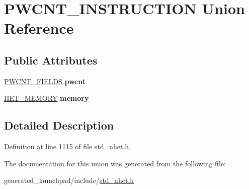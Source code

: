 \hypertarget{unionPWCNT__INSTRUCTION}{}\section{P\+W\+C\+N\+T\+\_\+\+I\+N\+S\+T\+R\+U\+C\+T\+I\+ON Union Reference}
\label{unionPWCNT__INSTRUCTION}
\subsection*{Public Attributes}
\begin{DoxyCompactItemize}
\item 
\mbox{\label{unionPWCNT__INSTRUCTION_a38bec71f77c8f6a0e643543f1e75f238}} 
\mbox{\hyperlink{structpwcnt__format}{P\+W\+C\+N\+T\+\_\+\+F\+I\+E\+L\+DS}} {\bfseries pwcnt}
\item 
\mbox{\label{unionPWCNT__INSTRUCTION_ad752151e040a50ac1f3f3d0f44521c13}} 
\mbox{\hyperlink{structmemory__format}{H\+E\+T\+\_\+\+M\+E\+M\+O\+RY}} {\bfseries memory}
\end{DoxyCompactItemize}


\subsection{Detailed Description}


Definition at line 1115 of file std\+\_\+nhet.\+h.



The documentation for this union was generated from the following file\+:\begin{DoxyCompactItemize}
\item 
generated\+\_\+launchpad/include/\mbox{\hyperlink{std__nhet_8h}{std\+\_\+nhet.\+h}}\end{DoxyCompactItemize}
